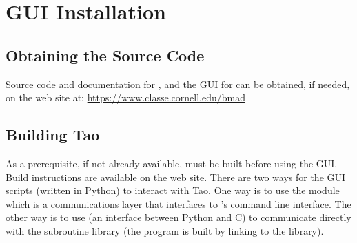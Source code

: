 \chapter{GUI Installation}
\label{s:gui.install}

\section{Obtaining the Source Code}

Source code and documentation for \bmad, \tao and the GUI for \tao can be obtained, if needed, on
the \bmad web site at:
  \hfill\break \hspace*{0.3in} \url{https://www.classe.cornell.edu/bmad}

\section{Building Tao}

As a prerequisite, if not already available, \tao must be built before using the GUI. Build
instructions are available on the \bmad web site. There are two ways for the GUI scripts (written in
Python) to interact with Tao. One way is to use the  module which is a communications
layer that interfaces to \tao's command line interface. The other way is to use  (an
interface between Python and C) to communicate directly with the \tao subroutine library (the \tao
program is built by linking to the \tao library). 

